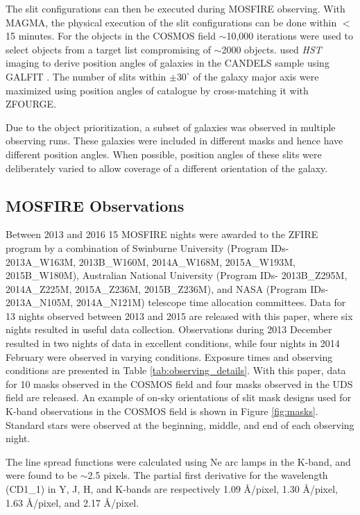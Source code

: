 \documentclass[iop]{emulateapj}
\newcommand{\around}{$\sim$}
\begin{document}
The slit configurations can then be executed during  MOSFIRE observing. With MAGMA, the physical execution of the slit configurations can be done within $<$15 minutes. 
For the objects in the COSMOS field \around10,000 iterations were used to select objects from a target list compromising of \around2000 objects. 
\citet{vanderWel2012} used \emph{HST} imaging to derive position angles of galaxies in the CANDELS sample using GALFIT \citep{Peng2010b}. 
The number of slits within $\pm30^{\circ}$ of the galaxy major axis were maximized using position angles of \citet{vanderWel2012} catalogue by cross-matching it with ZFOURGE. 


Due to the object prioritization, a subset of galaxies was observed in multiple observing runs. These galaxies were included in different masks and hence have different position angles. When possible, position angles of these slits were deliberately varied to allow coverage of a different orientation of the galaxy. 


\subsection{MOSFIRE Observations}

Between 2013 and 2016 15 MOSFIRE nights were awarded to the ZFIRE program  by a 
combination of Swinburne University (Program IDs- 2013A\_W163M, 2013B\_W160M, 2014A\_W168M, 2015A\_W193M, 2015B\_W180M), Australian National University (Program IDs- 2013B\_Z295M, 2014A\_Z225M, 2015A\_Z236M, 2015B\_Z236M), and NASA (Program IDs- 2013A\_N105M, 2014A\_N121M) telescope time allocation committees. 
Data for 13 nights observed between 2013 and 2015 are released with this paper, where six nights resulted in useful data collection. 
Observations during 2013 December resulted in two nights of data in excellent conditions, while four nights in 2014 February were observed in varying conditions. Exposure times and observing conditions are presented in Table \ref{tab:observing_details}. 
With this paper, data for 10 masks observed in the COSMOS field and four masks observed in the UDS field are released. An example of on-sky orientations of slit mask designs used for K-band observations in the COSMOS field is shown in Figure \ref{fig:masks}. 
Standard stars were observed at the beginning, middle, and end of each observing night. 

The line spread functions were calculated using Ne arc lamps in the K-band, and were found to be \around2.5 pixels. The partial first derivative for the wavelength (CD1\_1) in Y, J, H, and K-bands are respectively 1.09 \AA/pixel, 1.30 \AA/pixel, 1.63 \AA/pixel, and 2.17 \AA/pixel. 
\end{document}
